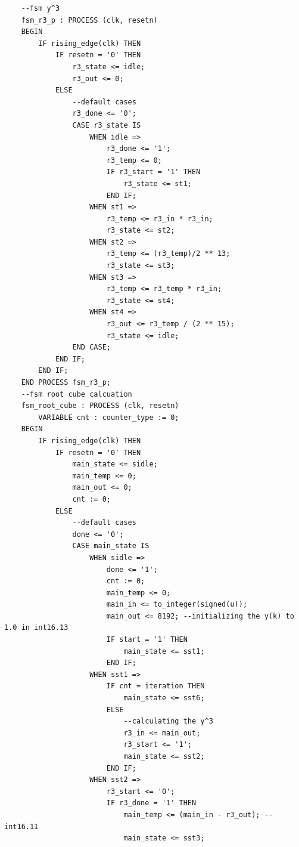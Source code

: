 \documentclass[11pt, a4paper]{report}
\begin{document}
\begin{verbatim}
    --fsm y^3 
    fsm_r3_p : PROCESS (clk, resetn)
    BEGIN
        IF rising_edge(clk) THEN
            IF resetn = '0' THEN
                r3_state <= idle;
                r3_out <= 0;
            ELSE
                --default cases
                r3_done <= '0';
                CASE r3_state IS
                    WHEN idle =>
                        r3_done <= '1';
                        r3_temp <= 0;
                        IF r3_start = '1' THEN
                            r3_state <= st1;
                        END IF;
                    WHEN st1 =>
                        r3_temp <= r3_in * r3_in;
                        r3_state <= st2;
                    WHEN st2 =>
                        r3_temp <= (r3_temp)/2 ** 13;
                        r3_state <= st3;
                    WHEN st3 =>
                        r3_temp <= r3_temp * r3_in;
                        r3_state <= st4;
                    WHEN st4 =>
                        r3_out <= r3_temp / (2 ** 15);
                        r3_state <= idle;
                END CASE;
            END IF;
        END IF;
    END PROCESS fsm_r3_p;
    --fsm root cube calcuation 
    fsm_root_cube : PROCESS (clk, resetn)
        VARIABLE cnt : counter_type := 0;
    BEGIN
        IF rising_edge(clk) THEN
            IF resetn = '0' THEN
                main_state <= sidle;
                main_temp <= 0;
                main_out <= 0;
                cnt := 0;
            ELSE
                --default cases 
                done <= '0';
                CASE main_state IS
                    WHEN sidle =>
                        done <= '1';
                        cnt := 0;
                        main_temp <= 0;
                        main_in <= to_integer(signed(u));
                        main_out <= 8192; --initializing the y(k) to 1.0 in int16.13  
                        IF start = '1' THEN
                            main_state <= sst1;
                        END IF;
                    WHEN sst1 =>
                        IF cnt = iteration THEN
                            main_state <= sst6;
                        ELSE
                            --calculating the y^3 
                            r3_in <= main_out;
                            r3_start <= '1';
                            main_state <= sst2;
                        END IF;
                    WHEN sst2 =>
                        r3_start <= '0';
                        IF r3_done = '1' THEN
                            main_temp <= (main_in - r3_out); --int16.11 
                            main_state <= sst3;

\end{verbatim}
\end{document}
